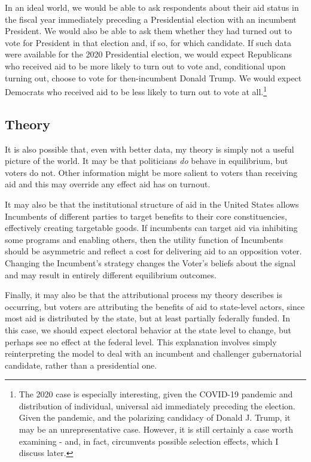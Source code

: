 \documentclass[12pt]{paper}
\begin{document}
In an ideal world, we would be able to ask respondents about their aid status in the fiscal year immediately preceding a Presidential election with an incumbent President. We would also be able to ask them whether they had turned out to vote for President in that election and, if so, for which candidate. If such data were available for the 2020 Presidential election, we would expect Republicans who received aid to be more likely to turn out to vote and, conditional upon turning out, choose to vote for then-incumbent Donald Trump. We would expect Democrats who received aid to be less likely to turn out to vote at all.\footnote{The 2020 case is especially interesting, given the COVID-19 pandemic and distribution of individual, universal aid immediately preceding the election. Given the pandemic, and the polarizing candidacy of Donald J. Trump, it may be an unrepresentative case. However, it is still certainly a case worth examining - and, in fact, circumvents possible selection effects, which I discuss later.}

\subsection{Theory}
It is also possible that, even with better data, my theory is simply not a useful picture of the world. It may be that politicians \textit{do} behave in equilibrium, but voters do not. Other information might be more salient to voters than receiving aid and this may override any effect aid has on turnout.

It may also be that the institutional structure of aid in the United States allows Incumbents of different parties to target benefits to their core constituencies, effectively creating targetable goods. If incumbents can target aid via inhibiting some programs and enabling others, then the utility function of Incumbents should be asymmetric and reflect a cost for delivering aid to an opposition voter. Changing the Incumbent's strategy changes the Voter's beliefs about the signal and may result in entirely different equilibrium outcomes. 

Finally, it may also be that the attributional process my theory describes is occurring, but voters are attributing the benefits of aid to state-level actors, since most aid is distributed by the state, but at least partially federally funded. In this case, we should expect electoral behavior at the state level to change, but perhaps see no effect at the federal level. This explanation involves simply reinterpreting the model to deal with an incumbent and challenger gubernatorial candidate, rather than a presidential one.
\end{document}
